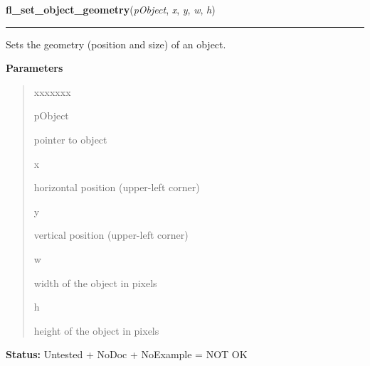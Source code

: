 \hspace{.8\funcindent}\begin{boxedminipage}{\funcwidth}

    \raggedright \textbf{fl\_set\_object\_geometry}(\textit{pObject}, \textit{x}, \textit{y}, \textit{w}, \textit{h})

    \vspace{-1.5ex}

    \rule{\textwidth}{0.5\fboxrule}
\setlength{\parskip}{2ex}
    Sets the geometry (position and size) of an object.

\setlength{\parskip}{1ex}
      \textbf{Parameters}
      \vspace{-1ex}

      \begin{quote}
        \begin{Ventry}{xxxxxxx}

          \item[pObject]

          pointer to object

          \item[x]

          horizontal position (upper-left corner)

          \item[y]

          vertical position (upper-left corner)

          \item[w]

          width of the object in pixels

          \item[h]

          height of the object in pixels

        \end{Ventry}

      \end{quote}

\textbf{Status:} Untested + NoDoc + NoExample = NOT OK



    \end{boxedminipage}

    \label{xformslib:library:fl_move_object}

    \vspace{0.5ex}

